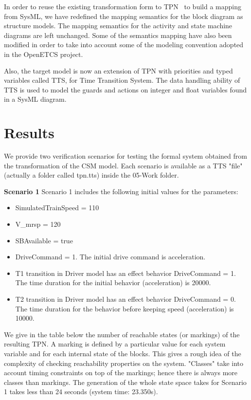 In order to reuse the existing transformation form \uml to
TPN~\cite{Ge2014} to build a mapping from SysML, we have redefined the
mapping semantics for the block diagram as structure models. The
mapping semantics for the activity and state machine diagrams are left
unchanged. Some of the semantics mapping have also been modified in
order to take into account some of the modeling convention adopted in
the OpenETCS project.

Also, the target model is now an extension of  TPN with
priorities and typed variables called TTS, for Time Transition
System. The data handling ability of TTS is used to model the guards
and actions on integer and float variables found in a SysML diagram.


\section{Results}

We provide two verification scenarios for testing the formal system
obtained from the transformation of the CSM model. Each scenario is
available as a TTS "file" (actually a folder called tpn.tts) inside
the 05-Work folder.

\textbf{Scenario 1}
Scenario 1 includes the following initial values for the parameters:
\begin{itemize}
\item
SimulatedTrainSpeed = 110
\item
V\_mrsp = 120
\item
SBAvailable = true
\item
DriveCommand = 1. The initial drive command is acceleration. 
\item
T1 transition in Driver model has an effect behavior DriveCommand = 1. The time duration for the initial behavior (acceleration) is 20000. 
\item
T2 transition in Driver model has an effect behavior DriveCommand = 0. The time duration for the behavior before keeping speed (acceleration) is 10000. 
\end{itemize}

We give in the table below the number of reachable states (or
markings) of the resulting TPN. A marking is defined by a particular
value for each system variable and for each internal state of the
blocks. This gives a rough idea of the complexity of checking
reachability properties on the system. "Classes" take into account
timing constraints on top of the markings; hence there is always more
classes than markings. The generation of the whole state space takes
for Scenario 1 takes
less than 24 seconds (system time: 23.350s).\\

